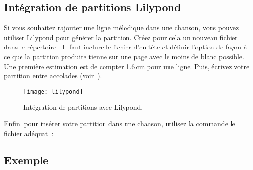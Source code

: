 \subsection{Intégration de partitions Lilypond}

Si vous souhaitez rajouter une ligne mélodique dans une chanson, vous
pouvez utiliser Lilypond pour générer la partition. Créez pour cela
un nouveau fichier  dans le répertoire
. Il faut inclure le fichier d'en-tête
 et définir l'option  de façon à ce que la
partition produite tienne sur une page avec le moins de blanc
possible. Une première estimation est de compter 1.6\,cm pour une
ligne. Puis, écrivez votre partition entre accolades
(voir~).

\begin{figure}
  \begin{minipage}[b]{\linewidth}
    \centering
    \texttt{[image: lilypond]}
    \vspace{0.5cm}
  \end{minipage}

  \begin{minipage}[b]{\linewidth}
  \end{minipage}
  \caption{Intégration de partitions avec Lilypond.}
  \label{fig:lilypond}
\end{figure}

Enfin, pour insérer votre partition  dans une
chanson, utilisez la commande  le fichier
 adéquat~:

\begin{songbook}
\end{songbook}

\subsection{Exemple}

